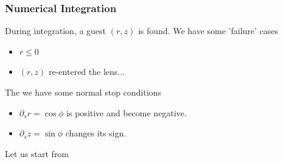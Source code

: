 \documentclass[aps,onecolumn]{revtex4}
\begin{document}
\subsubsection{Numerical Integration}
During integration, a guest $(r,z)$ is found.
We have some 'failure' cases
\begin{itemize}
\item $r\leq0$
\item $(r,z)$ re-entered the lens...
\end{itemize}

The we have some normal stop conditions
\begin{itemize}
\item $\partial_s r = \cos \phi$ is positive and become negative.
\item $\partial_s z = \sin \phi$ changes its sign.
\end{itemize}

Let us start from
\end{document}
